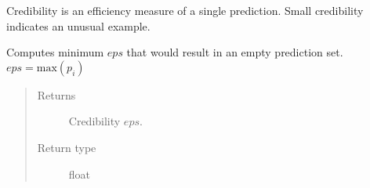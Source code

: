 \documentclass[letterpaper,10pt,english]{sphinxmanual}
\begin{document}
\begin{fulllineitems}
\begin{fulllineitems}
\label{cp.classification:cp.classification.PredictionClass.credibility}
Credibility is an efficiency measure of a single prediction.
Small credibility indicates an unusual example.

Computes minimum \(\mathit{eps}\) that would result in an empty prediction set.
\(\mathit{eps} = \text{max}(p_i)\)
\begin{quote}\begin{description}
\item[{Returns}] \leavevmode
Credibility \(\mathit{eps}\).

\item[{Return type}] \leavevmode
float

\end{description}\end{quote}

\end{fulllineitems}


\end{fulllineitems}

\end{document}
